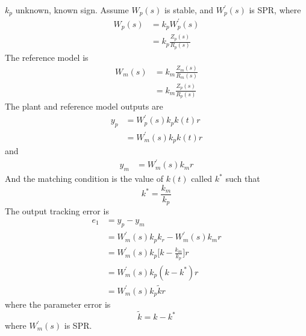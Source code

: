 $k_{p}$ unknown, known sign.
Assume $W_{p}(s)$ is stable, and $W_{p}^{\prime}(s)$ is SPR, where
\begin{align*}
  W_{p}(s)&=k_{p}W_{p}^{\prime}(s) \\
  &=k_{p}\frac{Z_{p}(s)}{R_{p}(s)}
\end{align*}
The reference model is
\begin{align*}
  W_{m}(s)&=k_{m}\frac{Z_{m}(s)}{R_{m}(s)} \\
  &=k_{m}\frac{Z_{p}(s)}{R_{p}(s)}
\end{align*}
The plant and reference model outputs are
\begin{align*}
  y_{p}&=W_{p}^{\prime}(s)k_{p}k(t)r \\
  &=W_{m}^{\prime}(s)k_{p}k(t)r
\end{align*}
and
\begin{align*}
  y_{m}&=W_{m}^{\prime}(s)k_{m}r
\end{align*}
And the matching condition is the value of $k(t)$ called $k^{*}$ such that
\begin{equation*}
  k^{*}=\frac{k_{m}}{k_{p}}
\end{equation*}
The output tracking error is
\begin{align*}
  e_{1}&=y_{p}-y_{m} \\
  &=W_{m}^{\prime}(s)k_{p}k_{r}-W_{m}^{\prime}(s)k_{m}r \\
  &=W_{m}^{\prime}(s)k_{p}\biggr[k-\frac{k_{m}}{k_{p}}\biggr]r \\
  &=W_{m}^{\prime}(s)k_{p}(k-k^{*})r \\
  &=W_{m}^{\prime}(s)k_{p}\tilde{k}r
\end{align*}
where the parameter error is
\begin{equation*}
  \tilde{k}=k-k^{*}
\end{equation*}
where $W_{m}^{\prime}(s)$ is SPR.\@

\begin{figure}[H]
  \begin{center}
  \end{center}
\end{figure}

